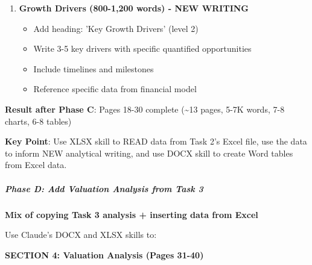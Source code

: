 \documentclass[11pt]{article}
\begin{document}
\begin{enumerate}[leftmargin=*,itemsep=2pt,topsep=2pt]
\item {} \textbf{Growth Drivers (800-1,200 words) - NEW WRITING}
\begin{itemize}[leftmargin=*,itemsep=2pt,topsep=2pt]
\item {} Add heading: 'Key Growth Drivers' (level 2)
\item {} Write 3-5 key drivers with specific quantified opportunities
\item {} Include timelines and milestones
\item {} Reference specific data from financial model
\end{itemize}
\end{enumerate}

\textbf{Result after Phase C}: Pages 18-30 complete (\textasciitilde{}13 pages, 5-7K words, 7-8 charts, 6-8 tables)


\textbf{Key Point}: Use XLSX skill to READ data from Task 2's Excel file, use the data to inform NEW analytical writing, and use DOCX skill to create Word tables from Excel data.


\subparagraph{Phase D: Add Valuation Analysis from Task 3}\mbox{}\par
\textbf{Mix of copying Task 3 analysis + inserting data from Excel}


Use Claude's DOCX and XLSX skills to:


\textbf{SECTION 4: Valuation Analysis (Pages 31-40)}
\end{document}
